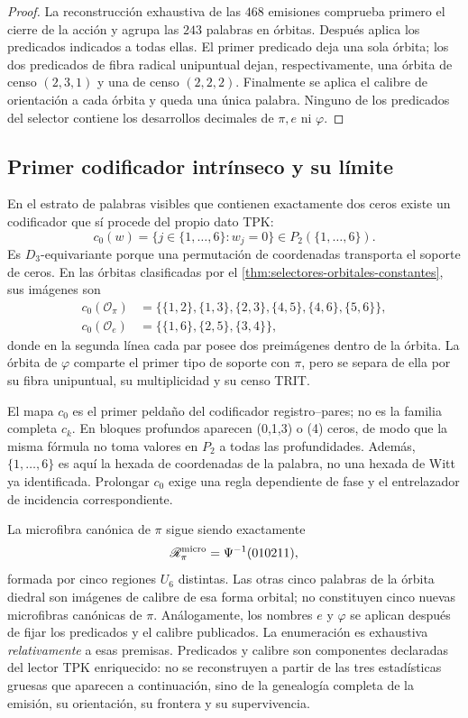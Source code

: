 \begin{proof}
La reconstrucción exhaustiva de las \(468\) emisiones comprueba primero el
cierre de la acción y agrupa las \(243\) palabras en órbitas. Después aplica
los predicados indicados a todas ellas. El primer predicado deja una sola
órbita; los dos predicados de fibra radical unipuntual dejan, respectivamente, una
órbita de censo \((2,3,1)\) y una de censo \((2,2,2)\). Finalmente se
aplica el calibre de orientación a cada órbita y queda una única palabra.
Ninguno de los predicados del selector contiene los desarrollos decimales de
\(\pi,e\) ni \(\varphi\).
\end{proof}

\subsection{Primer codificador intrínseco y su límite}

En el estrato de palabras visibles que contienen exactamente dos ceros existe
un codificador que sí procede del propio dato TPK:
\[
 c_0(w)=\{j\in\{1,\ldots,6\}:w_j=0\}
 \in P_2(\{1,\ldots,6\}).
\]
Es \(D_3\)-equivariante porque una permutación de coordenadas transporta el
soporte de ceros. En las órbitas clasificadas por el
\cref{thm:selectores-orbitales-constantes}, sus imágenes son
\[
\begin{aligned}
 c_0(\mathcal O_\pi)
 &=\{\{1,2\},\{1,3\},\{2,3\},\{4,5\},\{4,6\},\{5,6\}\},\\
 c_0(\mathcal O_e)
 &=\{\{1,6\},\{2,5\},\{3,4\}\},
\end{aligned}
\]
donde en la segunda línea cada par posee dos preimágenes dentro de la órbita.
La órbita de \(\varphi\) comparte el primer tipo de soporte con \(\pi\), pero
se separa de ella por su fibra unipuntual, su multiplicidad y su censo TRIT\@.

El mapa \(c_0\) es el primer peldaño del codificador registro--pares; no es la
familia completa \(c_k\). En bloques profundos aparecen (0,1,3) o (4)
ceros, de modo que la misma fórmula no toma valores en \(P_2\) a todas las
profundidades. Además, \(\{1,\ldots,6\}\) es aquí la hexada de coordenadas de
la palabra, no una hexada de Witt ya identificada. Prolongar \(c_0\) exige
una regla dependiente de fase y el entrelazador de incidencia correspondiente.

La microfibra canónica de \(\pi\) sigue siendo exactamente
\[
 \mathscr R_\pi^{\rm micro}=\Psi^{-1}(010211),
\]
formada por cinco regiones \(U_6\) distintas. Las otras cinco palabras de la
órbita diedral son imágenes de calibre de esa forma orbital; no constituyen
cinco nuevas microfibras canónicas de \(\pi\). Análogamente, los nombres
\(e\) y \(\varphi\) se aplican después de fijar los predicados y el calibre
publicados. La enumeración es exhaustiva \emph{relativamente} a esas
premisas. Predicados y calibre son componentes declaradas del lector TPK
enriquecido: no se reconstruyen a partir de las tres estadísticas gruesas
que aparecen a continuación, sino de la genealogía completa de la emisión,
su orientación, su frontera y su supervivencia.

